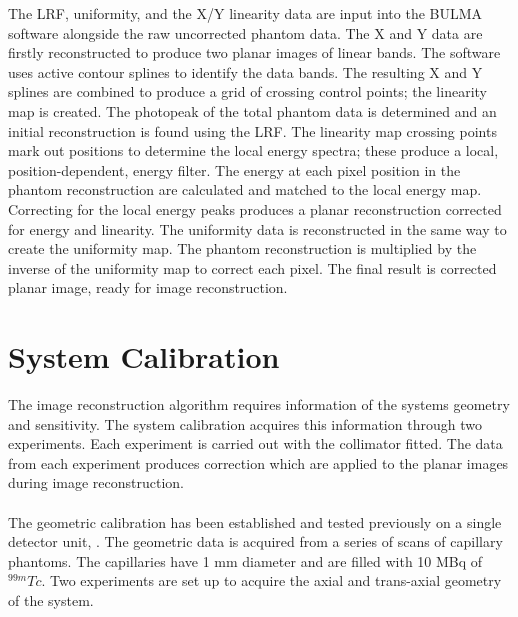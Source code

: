 The \acrshort{LRF}, uniformity, and the X/Y linearity data are input into the BULMA software alongside the raw uncorrected phantom data. The X and Y data are firstly reconstructed to produce two planar images of linear bands. The software uses active contour splines to identify the data bands. The resulting X and Y splines are combined to produce a grid of crossing control points; the linearity map is created. The photopeak of the total phantom data is determined and an initial reconstruction is found using the \acrshort{LRF}. The linearity map crossing points mark out positions to determine the local energy spectra; these produce a local, position-dependent, energy filter. The energy at each pixel position in the phantom reconstruction are calculated and matched to the local energy map. Correcting for the local energy peaks produces a planar reconstruction corrected for energy and linearity. The uniformity data is reconstructed in the same way to create the uniformity map. The phantom reconstruction is multiplied by the inverse of the uniformity map to correct each pixel. The final result is corrected planar image, ready for image reconstruction. 


\section{System Calibration}
The image reconstruction algorithm requires information of the systems geometry and sensitivity. The system calibration acquires this information through two experiments. Each experiment is carried out with the collimator fitted. The data from each experiment produces correction which are applied to the planar images during image reconstruction. 
 
 \paragraph{}
 
The geometric calibration has been established and tested previously on a single detector unit, \cite{8340862}. The geometric data is acquired from a series of scans of capillary phantoms. The capillaries have 1 mm diameter and are filled with 10 MBq of $^{99m}Tc$. Two experiments are set up to acquire the axial and trans-axial geometry of the system. 

